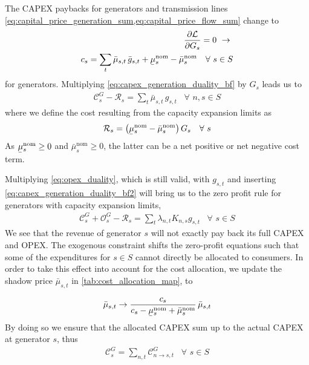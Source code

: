 \documentclass[11pt,twocolumn]{article}
\newcommand{\ubar}[1]{\underaccent{\bar}{#1}}
\newcommand{\Forall}[1]{\hspace{10pt} \forall \,\, #1 }
\newcommand{\pdv}[2]{\frac{\partial #1}{\partial #2}}
\newcommand{\generation}{g_{s,t}}
\newcommand{\generationpotential}{\bar{g}_{s,t}}
\newcommand{\capacitygeneration}{G_{s}}
\newcommand{\capitalpricegeneration}{c_{s}}
\newcommand{\muuppergeneration}{\bar{\mu}_{s,t}}
\newcommand{\muuppergenerationnom}{\bar{\mu}^\text{nom}_{s}}
\newcommand{\mulowergenerationnom}{\ubar{\mu}^\text{nom}_{s}}
\newcommand{\lagrangian}{\mathcal{L}}
\newcommand{\lmp}[1][n]{\lambda_{#1,t}}
\newcommand{\incidencegenerator}[1][n]{K_{#1,s}}
\newcommand{\allocatecapexgeneration}[1][n \rightarrow s]{\mathcal{C}^{G}_{#1,t}}
\newcommand{\opexgeneration}{\mathcal{O}^G}
\newcommand{\capexgeneration}{\mathcal{C}^G}
\newcommand{\remainingcost}{\mathcal{R}}
\begin{document}
The CAPEX paybacks for generators and transmission lines
\cref{eq:capital_price_generation_sum,eq:capital_price_flow_sum} change to 
\begin{align}
\pdv{\lagrangian}{\capacitygeneration}  = 0 \,\, \rightarrow \,\, \\
\capitalpricegeneration =  \sum_t \muuppergeneration \, \generationpotential + \mulowergenerationnom - \muuppergenerationnom \Forall{s \in S}
\label{eq:capex_generation_duality_bf}
\end{align}
for generators. Multiplying \cref{eq:capex_generation_duality_bf} by $ \capacitygeneration$ leads us to 
\begin{align}
 \capexgeneration_s - \remainingcost_s=  \sum_t \muuppergeneration \, \generation \Forall{n,s \in S}
 \label{eq:capex_generation_duality_bf2}
\end{align}
where we define the cost resulting from the capacity expansion limits as
\begin{align}
    \remainingcost_s = \left(\mulowergenerationnom - \muuppergenerationnom \right) \capacitygeneration
    \Forall{s}
\end{align}
As $\mulowergenerationnom \ge 0$ and $\muuppergenerationnom \ge 0$, the latter can be a net positive or net negative cost term.

Multiplying \cref{eq:opex_duality}, which is still valid, with $\generation$ and inserting \cref{eq:capex_generation_duality_bf2} will bring us to the zero profit rule for generators with capacity expansion limits, 
\begin{align}
    \capexgeneration_s + \opexgeneration_s  - \remainingcost_s = \sum_t \lmp \incidencegenerator \generation \Forall{s \in S}
\end{align}
We see that the revenue of generator $s$ will not exactly pay back its full CAPEX and OPEX. The exogenous constraint shifts the zero-profit equations such that some of the expenditures for $s \in S$ cannot directly be allocated to consumers. In order to take this effect into account for the cost allocation, we update the shadow price $\muuppergeneration$ in \cref{tab:cost_allocation_map}, to 

\begin{align}
    \muuppergeneration \rightarrow \dfrac{\capitalpricegeneration}{\capitalpricegeneration - \mulowergenerationnom + \muuppergenerationnom}\, \muuppergeneration
\end{align}
By doing so we ensure that the allocated CAPEX sum up to the actual CAPEX at generator $s$, thus 
\begin{align}
    \capexgeneration_s = \sum_{n,t} \allocatecapexgeneration \Forall{s \in S}
\end{align}
\end{document}
